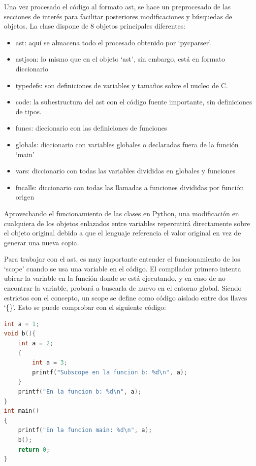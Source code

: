 Una vez procesado el código al formato \acrshort{ast}, se hace un preprocesado de las secciones de interés para facilitar posteriores modificaciones y búsquedas de objetos. La clase dispone de 8 objetos principales diferentes:
\begin{itemize}
    \item ast: aquí se almacena todo el procesado obtenido por `pycparser'.
    \item astjson: lo mismo que en el objeto `ast', sin embargo, está en formato diccionario
    \item typedefs:  son definiciones de variables y tamaños sobre el nucleo de C.
    \item code: la subestructura del \acrshort{ast} con el código fuente importante, sin definiciones de tipos.
    \item funcs: diccionario con las definiciones de funciones
    \item globals: diccionario con variables globales o declaradas fuera de la función `main'
    \item vars: diccionario con todas las variables divididas en globales y funciones
    \item fncalls: diccionario con todas las llamadas a funciones divididas por función origen
\end{itemize}

Aprovechando el funcionamiento de las clases en Python, una modificación en cualquiera de los objetos enlazados entre variables repercutirá directamente sobre el objeto original debido a que el lenguaje referencia el valor original en vez de generar una nueva copia.

Para trabajar con el \acrshort{ast}, es muy importante entender el funcionamiento de los `scope' cuando se usa una variable en el código.
El compilador primero intenta ubicar la variable en la función donde se está ejecutando, y en caso de no encontrar la variable, probará a buscarla de nuevo en el entorno global.
Siendo estrictos con el concepto, un scope se define como código aislado entre dos llaves `\{\}'.
Esto se puede comprobar con el siguiente código:
\pagebreak
\begin{lstlisting}[language=C, caption=Scopes en C]
int a = 1;
void b(){
    int a = 2;
    {
        int a = 3;
        printf("Subscope en la funcion b: %d\n", a);
    }
    printf("En la funcion b: %d\n", a);
}
int main()
{
    printf("En la funcion main: %d\n", a);
    b();
    return 0;
}
\end{lstlisting}

